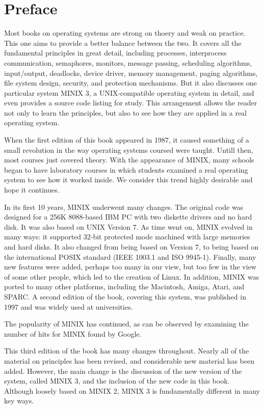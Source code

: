 \documentclass{book}
\begin{document}
\frontmatter
\chapter{Preface}
Most books on operating systems are strong on thoery and weak on practice. 
This one aims to provide a better balance between the two.
It covers all the fundamental principles in great detail, 
including processes, interprocess communication, semaphores, monitors, message passing, 
scheduling algorithms, input/output, deadlocks, device driver, memory management, paging algorithms,
file system design, security, and protection mechanisms.
But it also discusses one particular system MINIX 3, a UNIX-compatible operating system in detail, 
and even provides a source code listing for study.
This arrangement allows the reader not only to learn the principles, but also to see how they are applied in a real operating system.

When the first edition of this book appeared in 1987, it caused something of a small revolution in the way operating systems coursed were taught.
Untill then, most courses just covered theory.
With the appearance of MINIX, 
many schools began to have laboratory courses in which students examined a real operating system to see how it worked inside.
We consider this trend highly desirable and hope it continues.

In its first 10 years, MINIX underwent many changes.
The original code was designed for a 256K 8088-based IBM PC with two diskette drivers and no hard disk.
It was also based on UNIX Version 7. 
As time went on, MINIX evolved in many ways: it supported 32-bit protected mode machined with large memories and hard disks.
It also changed from being based on Version 7, to being based on the international POSIX standard (IEEE 1003.1 and ISO 9945-1).
Finally, many new features were added, perhaps too many in our view, but too few in the view of some other people, which led to the creation of Linux.
In addition, MINIX was ported to many other platforms, including the Macintosh, Amiga, Atari, and SPARC.
A second edition of the book, covering this system, was published in 1997 and was widely used at universities.

The popularity of MINIX has continued, as can be observed by examining the number of hits for MINIX found by Google.
 
This third edition of the book has many changes throughout.
Nearly all of the material on principles has been revised, and considerable new material has been added.
However, the main change is the discussion of the new version of the system, called MINIX 3, and the inclusion of the new code in this book.
Although loosely based on MINIX 2, MINIX 3 is fundamentally different in many key ways.
\end{document}
